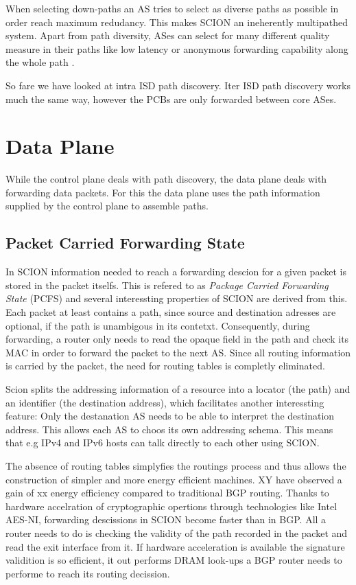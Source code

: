 \documentclass[../eva1_scion.tex]{subfiles}
\begin{document}
    When selecting down-paths an AS tries to select as diverse paths as possible in order reach maximum redudancy. This makes SCION an ineherently multipathed system. Apart from path diversity, ASes can select for many different quality measure in their paths like low latency or anonymous forwarding capability along the whole path \cite{scion_2011}.

    So fare we have looked at intra ISD path discovery. Iter ISD path discovery works much the same way, however the PCBs are only forwarded between core ASes.

    \section{Data Plane}
    While the control plane deals with path discovery, the data plane deals with forwarding data packets. For this the data plane uses the path information supplied by the control plane to assemble paths.

    \subsection{Packet Carried Forwarding State}\label{ssec:pcfs}
    In SCION information needed to reach a forwarding descion for a given packet is stored in the packet itselfs. This is refered to as \textit{Package Carried Forwarding State} (PCFS) and several interessting properties of SCION are derived from this. Each packet at least contains a path, since source and destination adresses are optional, if the path is unambigous in its contetxt. Consequently, during forwarding, a router only needs to read the opaque field in the path and check its MAC in order to forward the packet to the next AS. Since all routing information is carried by the packet, the need for routing tables is completly eliminated.

    Scion splits the addressing information of a resource into a locator (the path) and an identifier (the destination address), which facilitates another interessting feature: Only the destanation AS needs to be able to interpret the destination address. This allows each AS to choos its own addressing schema. This means that e.g IPv4 and IPv6 hosts can talk directly to each other using SCION.

    The absence of routing tables simplyfies the routings process and thus allows the construction of simpler and more energy efficient machines. XY have observed a gain of xx  energy efficiency compared to traditional BGP routing. Thanks to hardware accelration of cryptographic opertions through technologies like Intel AES-NI, forwarding descissions in SCION become faster than in BGP. All a router needs to do is checking the validity of the path recorded in the packet and read the exit interface from it. If hardware acceleration is available the signature validition is so efficient, it out performs DRAM look-ups a BGP router needs to performe to reach its routing decission. 
\end{document}
